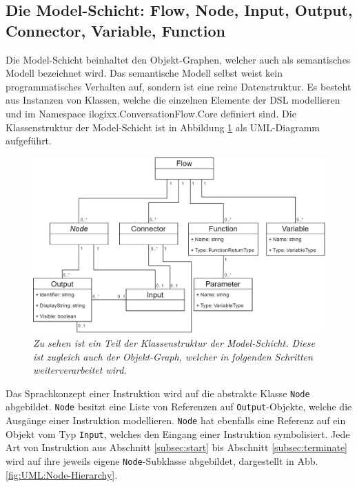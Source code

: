 \subsection[Die Model-Schicht]{Die Model-Schicht: Flow, Node, Input, Output, Connector, Variable, Function}
\label{subsec:Die Model-Schicht}
Die Model-Schicht beinhaltet den Objekt-Graphen, welcher auch als semantisches Modell bezeichnet wird. Das semantische Modell selbst weist kein programmatisches Verhalten auf, sondern ist eine reine Datenstruktur. Es besteht aus Instanzen von Klassen, welche die einzelnen Elemente der DSL modellieren und im Namespace ilogixx.ConversationFlow.Core definiert sind. Die Klassenstruktur der Model-Schicht ist in Abbildung \ref{fig:UML:Model-Schicht} als UML-Diagramm aufgeführt.

\begin{figure} %
	\centering
		\includegraphics[width=\textwidth]{img/FlowClassStructure.png}
	\caption[Klassenstruktur der Model-Schicht]{\textit{Zu sehen ist ein Teil der Klassenstruktur der Model-Schicht. Diese ist zugleich auch der Objekt-Graph, welcher in folgenden Schritten weiterverarbeitet wird.}}
	\label{fig:UML:Model-Schicht}
\end{figure}
\noindent Das Sprachkonzept einer Instruktion wird auf die abstrakte Klasse \texttt{Node} abgebildet. \texttt{Node} besitzt eine Liste von Referenzen auf \texttt{Output}-Objekte, welche die Ausgänge einer Instruktion modellieren. \texttt{Node} hat ebenfalls eine Referenz auf ein Objekt vom Typ \texttt{Input}, welches den Eingang einer Instruktion symbolisiert. Jede Art von Instruktion aus Abschnitt \ref{subsec:start} bis Abschnitt \ref{subsec:terminate} wird auf ihre jeweils eigene \texttt{Node}-Subklasse abgebildet, dargestellt in Abb. \ref{fig:UML:Node-Hierarchy}.

